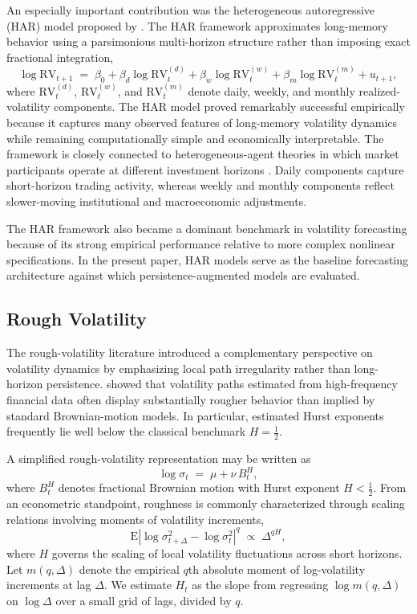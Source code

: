 \documentclass[jrfm,article,submit,moreauthors,pdftex]{Definitions/mdpi}
\begin{document}
An especially important contribution was the heterogeneous autoregressive
(HAR) model proposed by \citet{corsi2009simple}. The HAR framework
approximates long-memory behavior using a parsimonious multi-horizon
structure rather than imposing exact fractional integration,
\begin{equation}
  \log \mathrm{RV}_{t+1} \;=\; \beta_0 + \beta_d \log \mathrm{RV}^{(d)}_t
  + \beta_w \log \mathrm{RV}^{(w)}_t
  + \beta_m \log \mathrm{RV}^{(m)}_t
  + u_{t+1},
\end{equation}
where $\mathrm{RV}^{(d)}_t$, $\mathrm{RV}^{(w)}_t$, and
$\mathrm{RV}^{(m)}_t$ denote daily, weekly, and monthly realized-volatility
components. The HAR model proved remarkably successful empirically because
it captures many observed features of long-memory volatility dynamics while
remaining computationally simple and economically interpretable. The
framework is closely connected to heterogeneous-agent theories in which
market participants operate at different investment horizons
\citep{muller1997volatilities}. Daily components capture short-horizon
trading activity, whereas weekly and monthly components reflect
slower-moving institutional and macroeconomic adjustments.

The HAR framework also became a dominant benchmark in volatility forecasting
because of its strong empirical performance relative to more complex
nonlinear specifications. In the present paper, HAR models serve as the
baseline forecasting architecture against which persistence-augmented models
are evaluated.

\subsection{Rough Volatility}

The rough-volatility literature introduced a complementary perspective on
volatility dynamics by emphasizing local path irregularity rather than
long-horizon persistence. \citet{gatheral2018volatility} showed that
volatility paths estimated from high-frequency financial data often display
substantially rougher behavior than implied by standard Brownian-motion
models. In particular, estimated Hurst exponents frequently lie well below
the classical benchmark $H=\frac{1}{2}$.

A simplified rough-volatility representation may be written as
\begin{equation}
  \log \sigma_t \;=\; \mu + \nu\, B^H_t,
\end{equation}
where $B^H_t$ denotes fractional Brownian motion with Hurst exponent
$H<\frac{1}{2}$. From an econometric standpoint, roughness is commonly
characterized through scaling relations involving moments of volatility
increments,
\begin{equation}
  \mathrm{E}|\log\sigma^2_{t+\Delta} - \log\sigma^2_t|^q \;\propto\; \Delta^{qH},
\end{equation}
where $H$ governs the scaling of local volatility fluctuations across
short horizons. Let $m(q,\Delta)$ denote the empirical $q$th absolute
moment of log-volatility increments at lag $\Delta$. We estimate $H_t$
as the slope from regressing $\log m(q,\Delta)$ on $\log\Delta$ over
a small grid of lags, divided by $q$.
\end{document}
